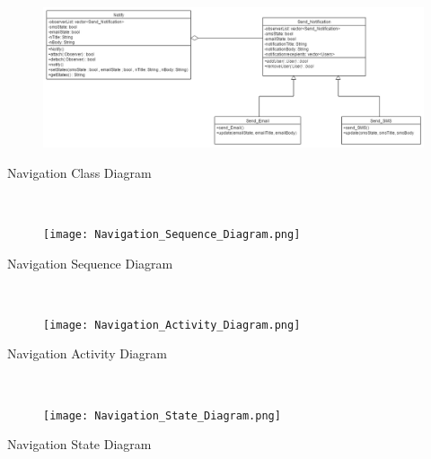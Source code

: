 \documentclass{article}
\begin{document}
\mbox{}\\
\bigskip


\begin{figure}[h!]
  \includegraphics[width=1.3\textwidth]{Notifications_Class_Diagram.png}
\end{figure}
Navigation Class Diagram

\mbox{}\\
\bigskip


\begin{figure}[h!]
  \texttt{[image: Navigation\_Sequence\_Diagram.png]}
\end{figure}
Navigation Sequence Diagram

\mbox{}\\
\bigskip
\clearpage

\begin{figure}[h!]
  \texttt{[image: Navigation\_Activity\_Diagram.png]}
\end{figure}
Navigation Activity Diagram

\mbox{}\\
\bigskip

\begin{figure}[h!]
  \texttt{[image: Navigation\_State\_Diagram.png]}
\end{figure}
Navigation State Diagram

\mbox{}\\
\end{document}
